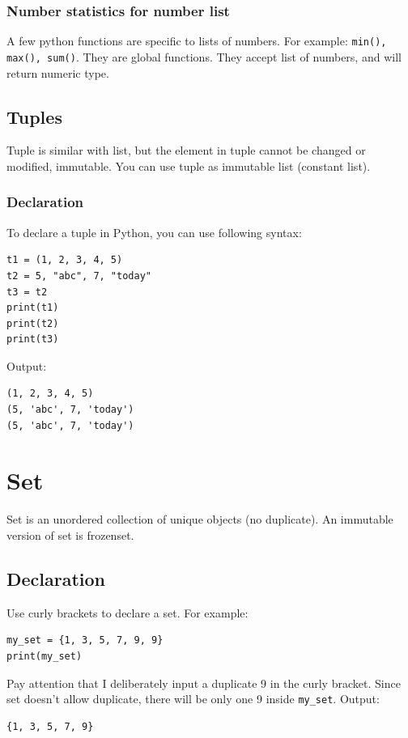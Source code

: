\documentclass[12pt]{book}
\begin{document}
\subsubsection{Number statistics for number list}
\label{sec:org998f21a}
A few python functions are specific to lists of numbers. For example: \texttt{min(), max(), sum()}. They are global functions. They accept list of numbers, and will return numeric type.

\subsection{Tuples}
\label{sec:orgfc8bb1d}
Tuple is similar with list, but the element in tuple cannot be changed or modified, immutable. You can use tuple as immutable list (constant list).
\subsubsection{Declaration}
\label{sec:org9d1fad6}
To declare a tuple in Python, you can use following syntax:
\begin{verbatim}
t1 = (1, 2, 3, 4, 5)
t2 = 5, "abc", 7, "today"
t3 = t2
print(t1)
print(t2)
print(t3)
\end{verbatim}
Output:
\begin{verbatim}
(1, 2, 3, 4, 5)
(5, 'abc', 7, 'today')
(5, 'abc', 7, 'today')
\end{verbatim}
\section{Set}
\label{sec:org1332da2}
Set is an unordered collection of unique objects (no duplicate). An immutable version of set is frozenset.
\subsection{Declaration}
\label{sec:org2807777}
Use curly brackets to declare a set. For example:
\begin{verbatim}
my_set = {1, 3, 5, 7, 9, 9}
print(my_set)
\end{verbatim}
Pay attention that I deliberately input a duplicate 9 in the curly bracket. Since set doesn't allow duplicate, there will be only one 9 inside \texttt{my\_set}. Output:
\begin{verbatim}
{1, 3, 5, 7, 9}
\end{verbatim}
\end{document}
